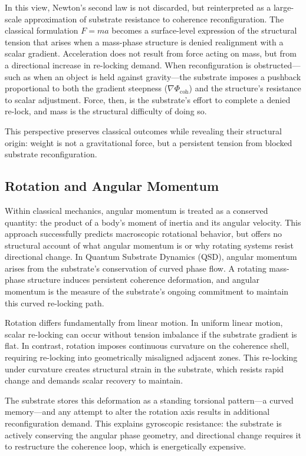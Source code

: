 \documentclass[entropy,article,submit,pdftex,moreauthors]{Definitions/mdpi}
\begin{document}
In this view, Newton’s second law is not discarded, but reinterpreted as a large-scale approximation of substrate resistance to coherence reconfiguration. The classical formulation \( F = ma \) becomes a surface-level expression of the structural tension that arises when a mass-phase structure is denied realignment with a scalar gradient. Acceleration does not result from force acting on mass, but from a directional increase in re-locking demand. When reconfiguration is obstructed—such as when an object is held against gravity—the substrate imposes a pushback proportional to both the gradient steepness (\( \nabla \Phi_{\text{coh}} \)) and the structure’s resistance to scalar adjustment. Force, then, is the substrate’s effort to complete a denied re-lock, and mass is the structural difficulty of doing so.

This perspective preserves classical outcomes while revealing their structural origin: weight is not a gravitational force, but a persistent tension from blocked substrate reconfiguration.



\subsection{Rotation and Angular Momentum}

Within classical mechanics, angular momentum is treated as a conserved quantity: the product of a body’s moment of inertia and its angular velocity. This approach successfully predicts macroscopic rotational behavior, but offers no structural account of what angular momentum is or why rotating systems resist directional change. In Quantum Substrate Dynamics (QSD), angular momentum arises from the substrate’s conservation of curved phase flow. A rotating mass-phase structure induces persistent coherence deformation, and angular momentum is the measure of the substrate’s ongoing commitment to maintain this curved re-locking path.

Rotation differs fundamentally from linear motion. In uniform linear motion, scalar re-locking can occur without tension imbalance if the substrate gradient is flat. In contrast, rotation imposes continuous curvature on the coherence shell, requiring re-locking into geometrically misaligned adjacent zones. This re-locking under curvature creates structural strain in the substrate, which resists rapid change and demands scalar recovery to maintain.

The substrate stores this deformation as a standing torsional pattern—a curved memory—and any attempt to alter the rotation axis results in additional reconfiguration demand. This explains gyroscopic resistance: the substrate is actively conserving the angular phase geometry, and directional change requires it to restructure the coherence loop, which is energetically expensive.
\end{document}
